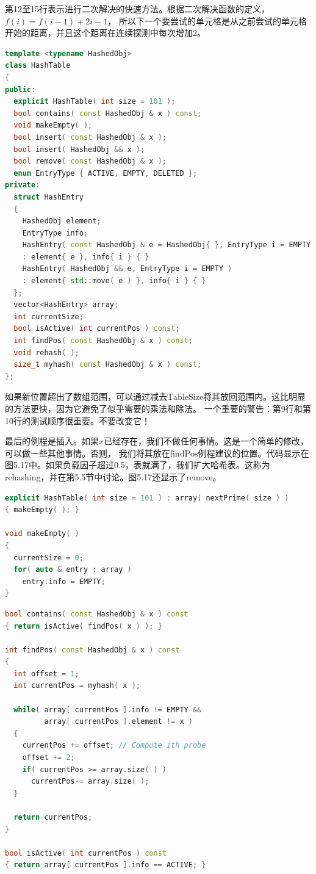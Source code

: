 \documentclass[a4paper]{ctexart}
\theoremstyle{definition}
\theoremstyle{definition}
\begin{document}
第12至15行表示进行二次解决的快速方法。根据二次解决函数的定义，$f(i) = f(i - 1) + 2i - 1$，
所以下一个要尝试的单元格是从之前尝试的单元格开始的距离，并且这个距离在连续探测中每次增加2。

\begin{lstlisting}[language=C++]
template <typename HashedObj>
class HashTable
{
public:
  explicit HashTable( int size = 101 );
  bool contains( const HashedObj & x ) const;
  void makeEmpty( );
  bool insert( const HashedObj & x );
  bool insert( HashedObj && x );
  bool remove( const HashedObj & x );
  enum EntryType { ACTIVE, EMPTY, DELETED };
private:
  struct HashEntry
  {
    HashedObj element;
    EntryType info;
    HashEntry( const HashedObj & e = HashedObj{ }, EntryType i = EMPTY )
    : element{ e }, info{ i } { }
    HashEntry( HashedObj && e, EntryType i = EMPTY )
    : element{ std::move( e ) }, info{ i } { }
  };
  vector<HashEntry> array;
  int currentSize;
  bool isActive( int currentPos ) const;
  int findPos( const HashedObj & x ) const;
  void rehash( );
  size_t myhash( const HashedObj & x ) const;
};  
\end{lstlisting}

如果新位置超出了数组范围，可以通过减去$\text{TableSize}$将其放回范围内。这比明显的方法更快，因为它避免了似乎需要的乘法和除法。
一个重要的警告：第9行和第10行的测试顺序很重要。不要改变它！

最后的例程是插入。如果$x$已经存在，我们不做任何事情。这是一个简单的修改，可以做一些其他事情。否则，
我们将其放在$\text{findPos}$例程建议的位置。代码显示在图5.17中。如果负载因子超过0.5，表就满了，我们扩大哈希表。这称为rehashing，并在第5.5节中讨论。图5.17还显示了remove。

\begin{lstlisting}[language=C++]
explicit HashTable( int size = 101 ) : array( nextPrime( size ) )
{ makeEmpty( ); }
  
void makeEmpty( )
{
  currentSize = 0;
  for( auto & entry : array )
    entry.info = EMPTY;
}  
\end{lstlisting}

\begin{lstlisting}[language=C++]
bool contains( const HashedObj & x ) const
{ return isActive( findPos( x ) ); }

int findPos( const HashedObj & x ) const
{
  int offset = 1;
  int currentPos = myhash( x );
  
  while( array[ currentPos ].info != EMPTY &&
         array[ currentPos ].element != x )
  {
    currentPos += offset; // Compute ith probe
    offset += 2;
    if( currentPos >= array.size( ) )
      currentPos-= array.size( );
  }
  
  return currentPos;
}

bool isActive( int currentPos ) const
{ return array[ currentPos ].info == ACTIVE; }  
\end{lstlisting}
\end{document}
